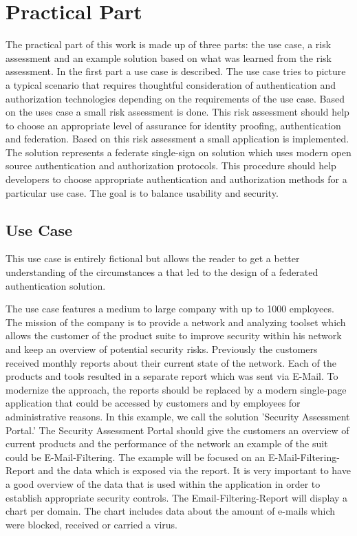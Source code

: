 \chapter{Practical Part}\label{chap:practicalPart}
\chapterstart

The practical part of this work is made up of three parts: the use case, a risk assessment and an example solution based on what was learned from the risk assessment. In the first part a use case is described. The use case tries to picture a typical scenario that requires thoughtful consideration of authentication and authorization technologies depending on the requirements of the use case. Based on the uses case a small risk assessment is done. This risk assessment should help to choose an appropriate level of assurance for identity proofing, authentication and federation. Based on this risk assessment a small application is implemented. The solution represents a federate single-sign on solution which uses modern open source authentication and authorization protocols. This procedure should help developers to choose appropriate authentication and authorization methods for a particular use case. The goal is to balance usability and security. 
\section{Use Case}
This use case is entirely fictional but allows the reader to get a better understanding of the circumstances a that led to the design of a federated authentication solution. 

The use case features a medium to large company with up to 1000 employees. The mission of the company is to provide a network and analyzing toolset which allows the customer of the product suite to improve security within his network and keep an overview of potential security risks. Previously the customers received monthly reports about their current state of the network. Each of the products and tools resulted in a separate report which was sent via E-Mail. To modernize the approach, the reports should be replaced by a modern single-page application that could be accessed by customers and by employees for administrative reasons. In this example, we call the solution 'Security Assessment Portal.' The Security Assessment Portal should give the customers an overview of current products and the performance of the network an example of the suit could be E-Mail-Filtering. The example will be focused on an E-Mail-Filtering-Report and the data which is exposed via the report. It is very important to have a good overview of the data that is used within the application in order to establish appropriate security controls. The Email-Filtering-Report will display a chart per domain. The chart includes data about the amount of e-mails which were blocked, received or carried a virus. 

